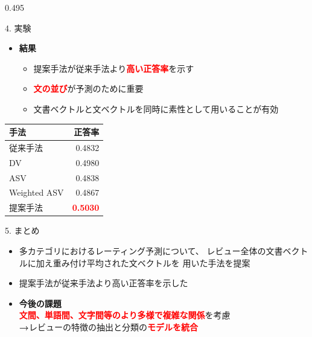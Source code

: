 \documentclass[unicode,10pt]{beamer}
\newcommand{\mycolumnwidth}{0.495\textwidth}
\newcommand{\arrow}{\textcolor{ttiblue}{\textbf{→}}\hspace{1ex}}
\newcommand{\itemtitle}[1]{\textbf{#1}\\}
\newcommand{\fire}[1]{\textcolor{red}{\textbf{#1}}}
\begin{document}
\begin{frame}
\begin{columns}[onlytextwidth,t]
\begin{column}{\mycolumnwidth}
\begin{block}{4. 実験}
    \begin{multicols}{2}
      \begin{itemize}
        \item \itemtitle{結果}
          \begin{itemize}
            \item 提案手法が従来手法より\fire{高い正答率}を示す
            \item \fire{文の並び}が予測のために重要
            \item 文書ベクトルと文ベクトルを同時に素性として用いることが有効
          \end{itemize}
      \end{itemize}
      \columnbreak
      \begin{table}
        \centering
        \begin{tabular}{l | r}
          手法 & 正答率 \\
          \hline
          従来手法\cite{fujitani15} & 0.4832 \\
          DV & 0.4980 \\
          ASV & 0.4838 \\
          Weighted ASV & 0.4867 \\
          提案手法 & \fire{0.5030} \\
        \end{tabular}
      \end{table}
    \end{multicols}
  \end{block}

  \begin{block}{5. まとめ}
    \begin{itemize}
      \item 多カテゴリにおけるレーティング予測について、
            レビュー全体の文書ベクトルに加え重み付け平均された文ベクトルを
            用いた手法を提案
      \item 提案手法が従来手法\cite{fujitani15}より高い正答率を示した
      \item \itemtitle{今後の課題}
            \fire{文間、単語間、文字間等のより多様で複雑な関係}を考慮 \\
            \arrow レビューの特徴の抽出と分類の\fire{モデルを統合}
    \end{itemize}
  \end{block}


\end{column}
\end{columns}
\end{frame}
\end{document}

